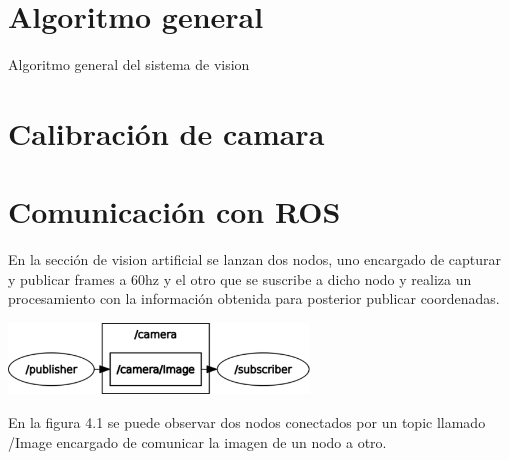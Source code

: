 \section{Algoritmo general}
\begin{algorithm}
	\caption{Algoritmo general del sistema de vision}
	\begin{algorithmic}[1]
	\end{algorithmic}
\end{algorithm}


\section{Calibración de camara}




\section{Comunicación con ROS}
En la sección de vision artificial se lanzan dos nodos, uno encargado de capturar y
publicar frames a 60hz y el otro que se suscribe a dicho nodo y realiza un procesamiento
con la información obtenida para posterior publicar coordenadas.
\begin{center}
	\includegraphics[width=0.6\textwidth]{Contenido/Cuerpo/Capitulo4/Fig0.eps}
	\label{Fig1}
\end{center}
En la figura 4.1 se puede observar dos nodos conectados por un topic llamado /Image
encargado de comunicar la imagen de un nodo a otro.
